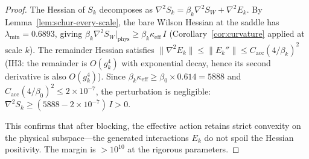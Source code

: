 \documentclass[11pt]{article}
\theoremstyle{definition}
\begin{document}
\begin{proof}
The Hessian of $S_k$ decomposes as
$\nabla^2 S_k=\beta_k\nabla^2 S_W+\nabla^2 E_k$.
By Lemma~\ref{lem:schur-every-scale}, the bare Wilson Hessian
at the saddle has $\lambda_{\min}=0.6893$, giving
$\beta_k\nabla^2 S_W\big|_{\mathrm{phys}}
\ge\beta_k\kappa_{\mathrm{eff}}\,I$
(Corollary~\ref{cor:curvature} applied at scale $k$).
The remainder Hessian satisfies
$\|\nabla^2 E_k\|\le\|E_k''\|
\le C_{\mathrm{acc}}(4/\beta_k)^2$
(IH3: the remainder is $O(g_k^4)$ with exponential decay,
hence its second derivative is also $O(g_k^4)$).
Since $\beta_k\kappa_{\mathrm{eff}}\ge\beta_0\times 0.614
=5888$ and $C_{\mathrm{acc}}(4/\beta_0)^2
\le 2\times 10^{-7}$, the perturbation is negligible:
$\nabla^2 S_k\ge(5888-2\times 10^{-7})\,I>0$.

This confirms that after blocking, the effective action
retains strict convexity on the physical subspace---the
generated interactions $E_k$ do not spoil the Hessian positivity.
The margin is $>10^{10}$ at the rigorous parameters.
\end{proof}
\end{document}
